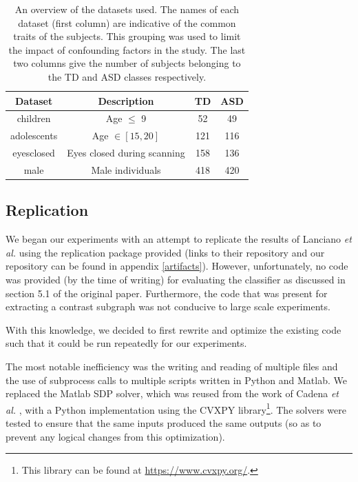 \documentclass[sigconf]{acmart}
\begin{document}
\begin{table}%
    \centering
    \caption{An overview of the datasets used. The names of each dataset (first column) are indicative of the common traits of the subjects. This grouping was used to limit the impact of confounding factors in the study. The last two columns give the number of subjects belonging to the TD and ASD classes respectively.}
    \begin{tabular}{c c c c}
        \hline
        Dataset & Description & TD & ASD \\
        \hline
        children &  Age $\leq$ 9 & 52 & 49 \\
        adolescents &  Age $\in [15,20]$ & 121 & 116 \\
        eyesclosed &  Eyes closed during scanning & 158 & 136 \\
        male &  Male individuals & 418 & 420 \\
        \hline
    \end{tabular}
    \label{tab:datasets}
\end{table}

\subsection{Replication}

We began our experiments with an attempt to replicate the results of Lanciano \emph{et al.} using the replication package provided (links to their repository and our repository can be found in appendix \ref{artifacts}).
However, unfortunately, no code was provided (by the time of writing) for evaluating the classifier as discussed in section 5.1 of the original paper.
Furthermore, the code that was present for extracting a contrast subgraph was not conducive to large scale experiments.

With this knowledge, we decided to first rewrite and optimize the existing code such that it could be run repeatedly for our experiments.

The most notable inefficiency was the writing and reading of multiple files and the use of subprocess calls to multiple scripts written in Python and Matlab.
We replaced the Matlab SDP solver, which was reused from the work of Cadena \emph{et al.} \cite{cadena2016}, with a Python implementation using the CVXPY library\footnote{This library can be found at \url{https://www.cvxpy.org/}.}.
The solvers were tested to ensure that the same inputs produced the same outputs (so as to prevent any logical changes from this optimization).
\end{document}

